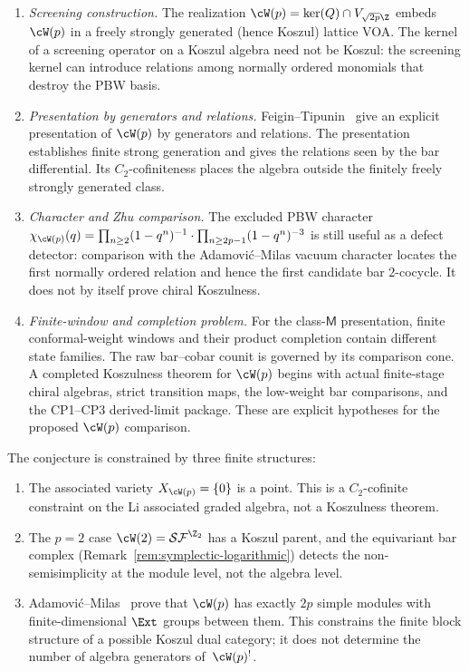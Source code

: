 \begin{enumerate}
\item \emph{Screening construction.} The realization
$\cW(p) = \ker(Q) \cap V_{\sqrt{2p}\Z}$ embeds $\cW(p)$
in a freely strongly generated (hence Koszul) lattice VOA.
The kernel of a screening operator on a Koszul algebra
need not be Koszul: the screening kernel can
introduce relations among normally ordered monomials that
destroy the PBW basis.

\item \emph{Presentation by generators and relations.}
Feigin--Tipunin~\cite{FeiginTipunin2010} give an explicit
presentation of $\cW(p)$ by generators and relations.
The presentation establishes finite strong generation and gives the
relations seen by the bar differential.  Its $C_2$-cofiniteness places
the algebra outside the finitely freely strongly generated class.

\item \emph{Character and Zhu comparison.}
The excluded PBW character
$\chi_{\cW(p)}(q) = \prod_{n \geq 2}(1-q^n)^{-1}
\cdot \prod_{n \geq 2p-1}(1-q^n)^{-3}$
is still useful as a defect detector: comparison with the
Adamovi\'c--Milas vacuum character locates the first normally
ordered relation and hence the first candidate bar $2$-cocycle.
It does not by itself prove chiral Koszulness.

\item \emph{Finite-window and completion problem.}
For the class-$\mathsf M$ presentation, finite conformal-weight windows
and their product completion contain different state families.  The
raw bar--cobar counit is governed by its comparison cone.  A completed
Koszulness theorem for $\cW(p)$ begins with actual finite-stage chiral
algebras, strict transition maps, the low-weight bar comparisons, and
the CP1--CP3 derived-limit package.  These are explicit hypotheses for
the proposed $\cW(p)$ comparison.
\end{enumerate}

\begin{remark}
\label{rem:wp-koszul-constraints}
The conjecture is constrained by three finite structures:
\begin{enumerate}
\item The associated variety $X_{\cW(p)} = \{0\}$ is a point. This
is a $C_2$-cofinite constraint on the Li associated graded algebra,
not a Koszulness theorem.
\item The $p = 2$ case $\cW(2) = \mathcal{SF}^{\Z_2}$ has
a Koszul parent, and the equivariant bar complex
(Remark~\ref{rem:symplectic-logarithmic}) detects
the non-semisimplicity at the module level, not the algebra
level.
\item Adamovi\'c--Milas~\cite{AdamovicMilas2008} prove that
$\cW(p)$ has exactly $2p$ simple modules with finite-dimensional
$\Ext$ groups between them. This constrains the finite block
structure of a possible Koszul dual category; it does not determine
the number of algebra generators of~$\cW(p)^!$.
\end{enumerate}
\end{remark}

